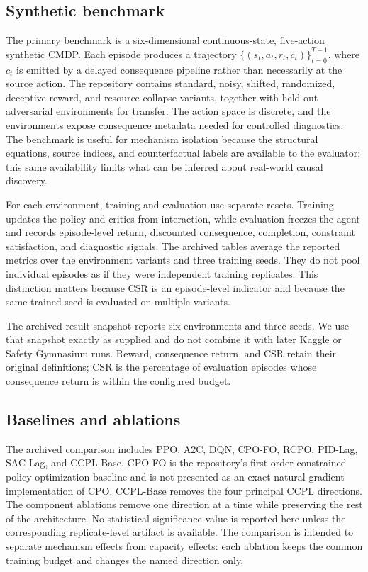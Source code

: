 \documentclass[10pt]{article}
\begin{document}
\subsection{Synthetic benchmark}
The primary benchmark is a six-dimensional continuous-state, five-action
synthetic CMDP. Each episode produces a trajectory
$\{(s_t,a_t,r_t,c_t)\}_{t=0}^{T-1}$, where $c_t$ is emitted by a delayed
consequence pipeline rather than necessarily at the source action. The
repository contains standard, noisy, shifted, randomized, deceptive-reward,
and resource-collapse variants, together with held-out adversarial
environments for transfer. The action space is discrete, and the environments
expose consequence metadata needed for controlled diagnostics. The benchmark
is useful for mechanism isolation because the structural equations, source
indices, and counterfactual labels are available to the evaluator; this same
availability limits what can be inferred about real-world causal discovery.

For each environment, training and evaluation use separate resets. Training
updates the policy and critics from interaction, while evaluation freezes the
agent and records episode-level return, discounted consequence, completion,
constraint satisfaction, and diagnostic signals. The archived tables average
the reported metrics over the environment variants and three training seeds.
They do not pool individual episodes as if they were independent training
replicates. This distinction matters because CSR is an episode-level indicator
and because the same trained seed is evaluated on multiple variants.

The archived result snapshot reports six environments and three seeds. We use
that snapshot exactly as supplied and do not combine it with later Kaggle or
Safety Gymnasium runs. Reward, consequence return, and CSR retain their
original definitions; CSR is the percentage of evaluation episodes whose
consequence return is within the configured budget.

\subsection{Baselines and ablations}
The archived comparison includes PPO, A2C, DQN, CPO-FO, RCPO, PID-Lag,
SAC-Lag, and CCPL-Base. CPO-FO is the repository's first-order constrained
policy-optimization baseline and is not presented as an exact natural-gradient
implementation of CPO. CCPL-Base removes the four principal CCPL directions.
The component ablations remove one direction at a time while preserving the
rest of the architecture. No statistical significance value is reported here
unless the corresponding replicate-level artifact is available. The comparison
is intended to separate mechanism effects from capacity effects: each ablation
keeps the common training budget and changes the named direction only.
\end{document}

